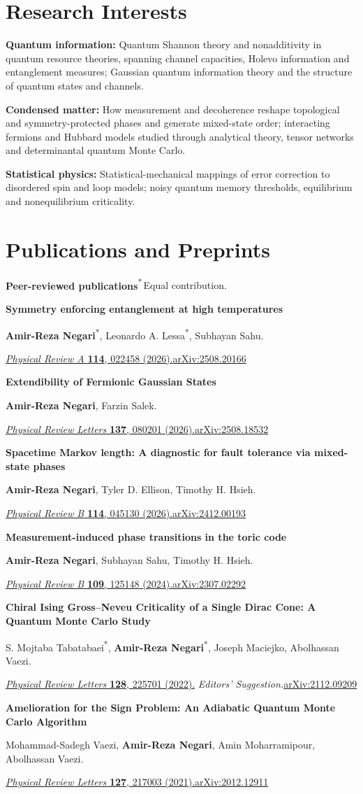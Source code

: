\documentclass[10pt,letterpaper]{article}
\newcommand{\me}{\textbf{Amir-Reza Negari}}
\newcommand{\equal}{\textsuperscript{*}}
\newcounter{paper}
\newcommand{\paperentry}[3]{\needspace{40pt}\stepcounter{paper}\noindent\makebox[20pt][l]{\textcolor{muted}{\thepaper.}}\begin{minipage}[t]{\dimexpr\linewidth-20pt\relax}\textbf{#1}\par #2\par #3\end{minipage}\par}
\newcommand{\pub}[4]{\paperentry{#1}{#2}{#3\enspace\href{https://arxiv.org/abs/#4}{arXiv:#4}}\vspace{7pt}}
\begin{document}
\section{Research Interests}
{\raggedright
\textbf{Quantum information:} Quantum Shannon theory and nonadditivity in quantum resource theories, spanning channel capacities, Holevo information and entanglement measures; Gaussian quantum information theory and the structure of quantum states and channels.\par
\vspace{3pt}
\textbf{Condensed matter:} How measurement and decoherence reshape topological and symmetry-protected phases and generate mixed-state order; interacting fermions and Hubbard models studied through analytical theory, tensor networks and determinantal quantum Monte Carlo.\par
\vspace{3pt}
\textbf{Statistical physics:} Statistical-mechanical mappings of error correction to disordered spin and loop models; noisy quantum memory thresholds, equilibrium and nonequilibrium criticality.\par}

\section{Publications and Preprints}
\textbf{Peer-reviewed publications}\hfill{\footnotesize\color{muted}\equal\,Equal contribution.}\par\vspace{5pt}
\pub{Symmetry enforcing entanglement at high temperatures}
{\me\equal, Leonardo A. Lessa\equal, Subhayan Sahu.}
{\href{https://doi.org/10.1103/rckt-3lfm}{\textit{Physical Review A} \textbf{114}, 022458 (2026).}}{2508.20166}
\pub{Extendibility of Fermionic Gaussian States}
{\me, Farzin Salek.}
{\href{https://doi.org/10.1103/65dd-448y}{\textit{Physical Review Letters} \textbf{137}, 080201 (2026).}}{2508.18532}
\pub{Spacetime Markov length: A diagnostic for fault tolerance via mixed-state phases}
{\me, Tyler D. Ellison, Timothy H. Hsieh.}
{\href{https://doi.org/10.1103/61wf-zx39}{\textit{Physical Review B} \textbf{114}, 045130 (2026).}}{2412.00193}
\pub{Measurement-induced phase transitions in the toric code}
{\me, Subhayan Sahu, Timothy H. Hsieh.}
{\href{https://doi.org/10.1103/PhysRevB.109.125148}{\textit{Physical Review B} \textbf{109}, 125148 (2024).}}{2307.02292}
\pub{Chiral Ising Gross--Neveu Criticality of a Single Dirac Cone: A Quantum Monte Carlo Study}
{S. Mojtaba Tabatabaei\equal, \me\equal, Joseph Maciejko, Abolhassan Vaezi.}
{\href{https://doi.org/10.1103/PhysRevLett.128.225701}{\textit{Physical Review Letters} \textbf{128}, 225701 (2022).} \textit{Editors' Suggestion.}}{2112.09209}
\pub{Amelioration for the Sign Problem: An Adiabatic Quantum Monte Carlo Algorithm}
{Mohammad-Sadegh Vaezi, \me, Amin Moharramipour, Abolhassan Vaezi.}
{\href{https://doi.org/10.1103/PhysRevLett.127.217003}{\textit{Physical Review Letters} \textbf{127}, 217003 (2021).}}{2012.12911}
\end{document}
